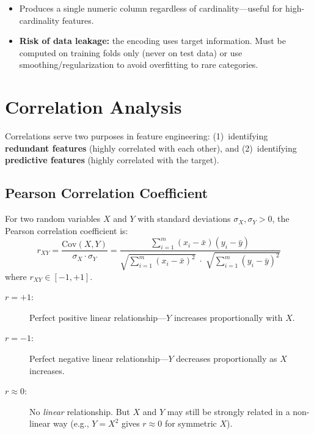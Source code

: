 \begin{itemize}
    \item Produces a single numeric column regardless of cardinality---useful for high-cardinality features.
    \item \textbf{Risk of data leakage:} the encoding uses target information. Must be computed on training folds only (never on test data) or use smoothing/regularization to avoid overfitting to rare categories.
\end{itemize}

\section*{Correlation Analysis}

Correlations serve two purposes in feature engineering: (1)~identifying \textbf{redundant features} (highly correlated with each other), and (2)~identifying \textbf{predictive features} (highly correlated with the target).

\subsection*{Pearson Correlation Coefficient}

\begin{definition}
For two random variables $X$ and $Y$ with standard deviations $\sigma_X, \sigma_Y > 0$, the Pearson correlation coefficient is:
$$r_{XY} = \frac{\text{Cov}(X, Y)}{\sigma_X \cdot \sigma_Y} = \frac{\displaystyle\sum_{i=1}^{m}(x_i - \bar{x})(y_i - \bar{y})}{\sqrt{\displaystyle\sum_{i=1}^{m}(x_i - \bar{x})^2} \;\cdot\; \sqrt{\displaystyle\sum_{i=1}^{m}(y_i - \bar{y})^2}}$$
where $r_{XY} \in [-1, +1]$.
\end{definition}

\begin{description}
    \item[$r = +1$:] Perfect positive linear relationship---$Y$ increases proportionally with $X$.
    \item[$r = -1$:] Perfect negative linear relationship---$Y$ decreases proportionally as $X$ increases.
    \item[$r \approx 0$:] No \emph{linear} relationship. But $X$ and $Y$ may still be strongly related in a non-linear way (e.g., $Y = X^2$ gives $r \approx 0$ for symmetric $X$).
\end{description}

